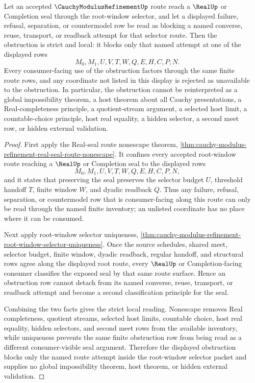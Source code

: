 \begin{corollary}
\label{cor:cauchy-modulus-refinement-root-window-selector-strict-obstruction}
Let an accepted $\CauchyModulusRefinementUp$ route reach a $\RealUp$ or Completion seal through the root-window selector, and let a displayed failure, refusal, separation, or countermodel row be read as blocking a named converse, reuse, transport, or readback attempt for that selector route. Then the obstruction is strict and local: it blocks only that named attempt at one of the displayed rows
$$
M_0,M_1,U,V,T,W,Q,E,H,C,P,N.
$$
Every consumer-facing use of the obstruction factors through the same finite route rows, and any coordinate not listed in this display is rejected as unavailable to the obstruction. In particular, the obstruction cannot be reinterpreted as a global impossibility theorem, a host theorem about all Cauchy presentations, a Real-completeness principle, a quotient-stream argument, a selected host limit, a countable-choice principle, host real equality, a hidden selector, a second meet row, or hidden external validation.
\end{corollary}
\begin{proof}
First apply the Real-seal route nonescape theorem, \autoref{thm:cauchy-modulus-refinement-real-seal-route-nonescape}. It confines every accepted root-window route reaching a $\RealUp$ or Completion seal to the displayed rows
$$
M_0,M_1,U,V,T,W,Q,E,H,C,P,N,
$$
and it states that preserving the seal preserves the selector budget $U$, threshold handoff $T$, finite window $W$, and dyadic readback $Q$. Thus any failure, refusal, separation, or countermodel row that is consumer-facing along this route can only be read through the named finite inventory; an unlisted coordinate has no place where it can be consumed.

Next apply root-window selector uniqueness, \autoref{thm:cauchy-modulus-refinement-root-window-selector-uniqueness}. Once the source schedules, shared meet, selector budget, finite window, dyadic readback, regular handoff, and structural rows agree along the displayed root route, every $\RealUp$ or Completion-facing consumer classifies the exposed seal by that same route surface. Hence an obstruction row cannot detach from its named converse, reuse, transport, or readback attempt and become a second classification principle for the seal.

Combining the two facts gives the strict local reading. Nonescape removes Real completeness, quotient streams, selected host limits, countable choice, host real equality, hidden selectors, and second meet rows from the available inventory, while uniqueness prevents the same finite obstruction row from being read as a different consumer-visible seal argument. Therefore the displayed obstruction blocks only the named route attempt inside the root-window selector packet and supplies no global impossibility theorem, host theorem, or hidden external validation.
\end{proof}
